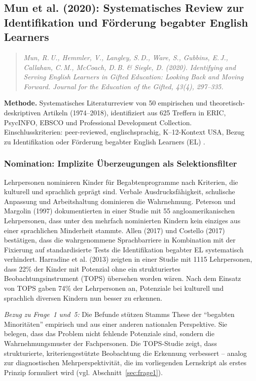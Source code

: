 \documentclass[ngerman, a4paper]{article}
\begin{document}
\subsection*{Mun et al. (2020): Systematisches Review zur Identifikation
  und Förderung begabter English Learners}
\label{subsec:mun2020}

\begin{quote}\itshape
Mun, R.\,U., Hemmler, V., Langley, S.\,D., Ware, S.,
Gubbins, E.\,J., Callahan, C.\,M., McCoach, D.\,B. \& Siegle, D.
(2020). Identifying and Serving English Learners in Gifted Education:
Looking Back and Moving Forward. \upshape Journal for the Education of
the Gifted, 43(4), 297--335.
\end{quote}

\textbf{Methode.} Systematisches Literaturreview von 50 empirischen und
theoretisch-deskriptiven Artikeln (1974--2018), identifiziert aus 625
Treffern in ERIC, PsycINFO, EBSCO und Professional Development Collection.
Einschlusskriterien: peer-reviewed, englischsprachig, K--12-Kontext USA,
Bezug zu Identifikation oder Förderung begabter English Learners (EL)
\parencite{mun2020identifying}.

\subsubsection*{Nomination: Implizite Überzeugungen als Selektionsfilter}

Lehrpersonen nominieren Kinder für Begabtenprogramme nach Kriterien, die
kulturell und sprachlich geprägt sind. Verbale Ausdrucksfähigkeit,
schulische Anpassung und Arbeitshaltung dominieren die Wahrnehmung.
Peterson und Margolin (1997) dokumentierten in einer Studie mit 55
angloamerikanischen Lehrpersonen, dass unter den mehrfach nominierten
Kindern kein einziges aus einer sprachlichen Minderheit stammte. Allen
(2017) und Costello (2017) bestätigen, dass die wahrgenommene
Sprachbarriere in Kombination mit der Fixierung auf standardisierte Tests
die Identifikation begabter EL systematisch verhindert. Harradine et al.
(2013) zeigten in einer Studie mit 1115 Lehrpersonen, dass 22\% der
Kinder mit Potenzial ohne ein strukturiertes Beobachtungsinstrument (TOPS)
übersehen worden wären. Nach dem Einsatz von TOPS gaben 74\% der
Lehrpersonen an, Potenziale bei kulturell und sprachlich diversen Kindern
nun besser zu erkennen.

\textit{Bezug zu Frage~1 und~5:} Die Befunde stützen Stamms These der
\enquote{begabten Minoritäten} empirisch und aus einer anderen nationalen
Perspektive. Sie belegen, dass das Problem nicht fehlende Potenziale sind,
sondern die Wahrnehmungsmuster der Fachpersonen. Die TOPS-Studie zeigt,
dass strukturierte, kriteriengestützte Beobachtung die Erkennung
verbessert -- analog zur diagnostischen Mehrperspektivität, die im
vorliegenden Lernskript als erstes Prinzip formuliert wird
(vgl. Abschnitt~\ref{sec:frage1}).
\end{document}
